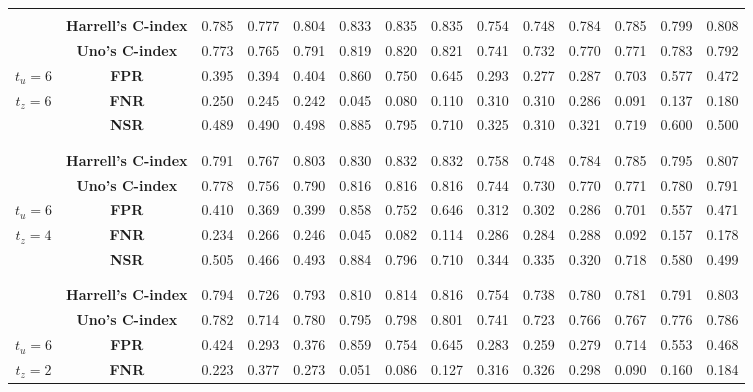 \begin{table}[!htbp]
\begin{tabular}{c|c|cccccc|cccccc}
\hline
& & & & & & & & & & & & & \\
 & {\bf Harrell’s C-index} & 0.785 & 0.777 & 0.804 & 0.833 & 0.835 & 0.835 & 0.754 & 0.748 & 0.784 & 0.785 & 0.799 & 0.808 \\
 & {\bf Uno's C-index} & 0.773 & 0.765 & 0.791 & 0.819 & 0.820 & 0.821 & 0.741 & 0.732 & 0.770 & 0.771 & 0.783 & 0.792 \\
$t_u=6$ & {\bf FPR} & 0.395 & 0.394 & 0.404 & 0.860 & 0.750 & 0.645 & 0.293 & 0.277 & 0.287 & 0.703 & 0.577 & 0.472 \\
$t_z=6$ & {\bf FNR} & 0.250 & 0.245 & 0.242 & 0.045 & 0.080 & 0.110 & 0.310 & 0.310 & 0.286 & 0.091 & 0.137 & 0.180 \\
 & {\bf NSR} & 0.489 & 0.490 & 0.498 & 0.885 & 0.795 & 0.710 & 0.325 & 0.310 & 0.321 & 0.719 & 0.600 & 0.500 \\
& & & & & & & & & & & & & \\
\hline
& & & & & & & & & & & & & \\
 & {\bf Harrell’s C-index} & 0.791 & 0.767 & 0.803 & 0.830 & 0.832 & 0.832 & 0.758 & 0.748 & 0.784 & 0.785 & 0.795 & 0.807 \\
 & {\bf Uno's C-index} & 0.778 & 0.756 & 0.790 & 0.816 & 0.816 & 0.816 & 0.744 & 0.730 & 0.770 & 0.771 & 0.780 & 0.791 \\
$t_u=6$ & {\bf FPR} & 0.410 & 0.369 & 0.399 & 0.858 & 0.752 & 0.646 & 0.312 & 0.302 & 0.286 & 0.701 & 0.557 & 0.471 \\
$t_z=4$ & {\bf FNR} & 0.234 & 0.266 & 0.246 & 0.045 & 0.082 & 0.114 & 0.286 & 0.284 & 0.288 & 0.092 & 0.157 & 0.178 \\
 & {\bf NSR} & 0.505 & 0.466 & 0.493 & 0.884 & 0.796 & 0.710 & 0.344 & 0.335 & 0.320 & 0.718 & 0.580 & 0.499 \\
& & & & & & & & & & & & & \\
\hline
& & & & & & & & & & & & & \\
 & {\bf Harrell’s C-index} & 0.794 & 0.726 & 0.793 & 0.810 & 0.814 & 0.816 & 0.754 & 0.738 & 0.780 & 0.781 & 0.791 & 0.803 \\
 & {\bf Uno's C-index} & 0.782 & 0.714 & 0.780 & 0.795 & 0.798 & 0.801 & 0.741 & 0.723 & 0.766 & 0.767 & 0.776 & 0.786 \\
$t_u=6$ & {\bf FPR} & 0.424 & 0.293 & 0.376 & 0.859 & 0.754 & 0.645 & 0.283 & 0.259 & 0.279 & 0.714 & 0.553 & 0.468 \\
$t_z=2$ & {\bf FNR} & 0.223 & 0.377 & 0.273 & 0.051 & 0.086 & 0.127 & 0.316 & 0.326 & 0.298 & 0.090 & 0.160 & 0.184 \\

\end{tabular}
\end{table}
